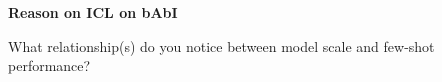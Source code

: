 \item {} {\bf Reason on ICL on bAbI}


What relationship(s) do you notice between model scale and few-shot performance?